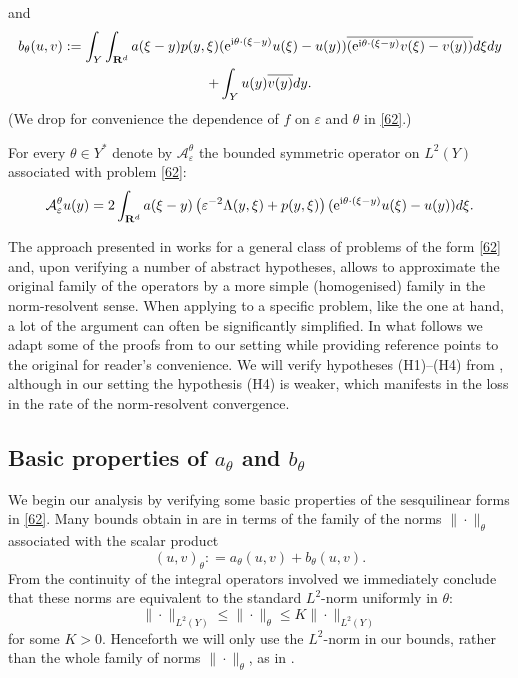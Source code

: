 \documentclass[11pt]{article}
\newcommand\e {\varepsilon}
\def\rme{{\rm e}}
\def\rmi{{\rm i}}
\newcommand{\R}{\mathbf{R}}
\newcommand\A{\mathcal A}
\theoremstyle{remark}
\begin{document}
and
\begin{multline}\label{64}
	b_\theta(u,v) : =  \int_{Y}\int_{\R^d} a(\xi - y) p(y,\xi) (\rme^{\rmi \theta\cdot(\xi - y)} u(\xi)-u(y))\overline{(\rme^{\rmi \theta\cdot(\xi - y)} v(\xi)-v(y))}d\xi dy \\ +  \int_{Y} u(y)\overline{v(y)} dy.
\end{multline}
(We drop for convenience the dependence of  $f$ on $\e$ and $\theta$ in \eqref{62}.)

For every $\theta\in Y^*$ denote by $\A_\e^\theta$ the bounded symmetric operator on $L^2(Y)$ associated with problem \eqref{62}:
\begin{equation*} %
	\A_\e^\theta u(y) = 2	\int_{\R^d} a(\xi - y) \left( \e^{-2}\Lambda(y,\xi) +  p(y,\xi)\right) (\rme^{\rmi \theta\cdot(\xi - y)} u(\xi)-u(y)) d\xi.
\end{equation*}

The approach presented in \cite{CKS2023} works for a  general class of problems of the form \eqref{62} and, upon verifying a number of abstract hypotheses,  allows to approximate the original family of the operators by a more simple (homogenised) family in the norm-resolvent sense. When applying to a specific problem, like the one at hand, a lot of the argument can often be significantly simplified. In what follows we adapt some of the proofs from  \cite{CKS2023} to our setting while providing reference points to the original for reader's convenience. We will verify hypotheses (H1)--(H4) from \cite{CKS2023}, although in our setting the hypothesis (H4) is weaker, which manifests in the loss in the rate of the norm-resolvent convergence.


\subsection{Basic  properties of $a_\theta$ and $b_\theta$}
We begin our analysis by verifying some basic properties of the sesquilinear forms in \eqref{62}. Many bounds  obtain in  \cite{CKS2023} are in terms of the family of  the norms $\|\cdot \|_\theta$ associated with  the scalar product
\begin{equation*}
	(u, v)_\theta : = a_\theta(u,v)  + b_\theta(u,v).
\end{equation*}
From the continuity of the integral operators involved we immediately conclude that these norms are equivalent to the standard $L^2$-norm   uniformly in $\theta$:
\begin{equation*}%
	\|\cdot \|_{L^2(Y)} \leq \|\cdot \|_{\theta} \leq K  	\|\cdot \|_{L^2(Y)}
\end{equation*}
for some $K>0$. Henceforth we will only use the $L^2$-norm in our bounds, rather than the whole family of norms $\|\cdot \|_{\theta} $, as in \cite{CKS2023}.
\end{document}
